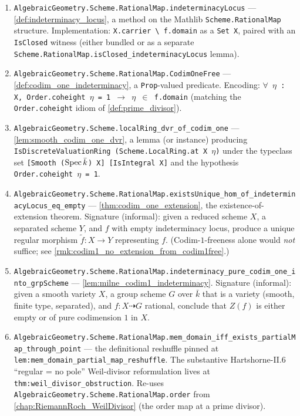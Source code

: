 \begin{enumerate}
  \item \texttt{AlgebraicGeometry.Scheme.RationalMap.indeterminacyLocus} ---
    \cref{def:indeterminacy_locus}, a method on the Mathlib
    \texttt{Scheme.RationalMap} structure. Implementation: \texttt{X.carrier
    \textbackslash{} f.domain} as a \texttt{Set X}, paired with an
    \texttt{IsClosed} witness (either bundled or as a separate
    \texttt{Scheme.RationalMap.isClosed\_indeterminacyLocus} lemma).
  \item \texttt{AlgebraicGeometry.Scheme.RationalMap.CodimOneFree} ---
    \cref{def:codim_one_indeterminacy}, a \texttt{Prop}-valued predicate. Encoding:
    \texttt{\(\forall\) \(\eta\) : X, Order.coheight \(\eta\) = 1 \(\to\) \(\eta\) \(\in\)
    f.domain} (matching the \texttt{Order.coheight} idiom of
    \cref{def:prime_divisor}).
  \item \texttt{AlgebraicGeometry.Scheme.localRing\_dvr\_of\_codim\_one} ---
    \cref{lem:smooth_codim_one_dvr}, a lemma (or instance) producing
    \texttt{IsDiscreteValuationRing (Scheme.LocalRing.at\ X \(\eta\))} under the
    typeclass set \texttt{[Smooth (\(\operatorname{Spec} \bar k\)) X] [IsIntegral X]} and the
    hypothesis \texttt{Order.coheight \(\eta\) = 1}.
  \item \texttt{AlgebraicGeometry.Scheme.RationalMap.existsUnique\_hom\_of\_indeterminacyLocus\_eq\_empty}
    --- \cref{thm:codim_one_extension}, the existence-of-extension theorem. Signature
    (informal): given a reduced scheme \(X\), a separated scheme \(Y\), and
    \(f\) with empty indeterminacy locus, produce a unique regular morphism
    \(\widetilde f \colon X \to Y\) representing \(f\). (Codim-\(1\)-freeness alone
    would \emph{not} suffice; see \cref{rmk:codim1_no_extension_from_codim1free}.)
  \item \texttt{AlgebraicGeometry.Scheme.RationalMap.indeterminacy\_pure\_codim\_one\_into\_grpScheme}
    --- \cref{lem:milne_codim1_indeterminacy}. Signature (informal): given a smooth
    variety \(X\), a group scheme \(G\) over \(\bar k\) that is a variety (smooth, finite
    type, separated), and \(f \colon X \dashrightarrow G\) rational, conclude that
    \(Z(f)\) is either empty or of pure codimension \(1\) in \(X\).
  \item \texttt{AlgebraicGeometry.Scheme.RationalMap.mem\_domain\_iff\_exists\_partialMap\_through\_point}
    --- the definitional reshuffle pinned at
    \texttt{lem:mem_domain_partial_map_reshuffle}. The substantive
    Hartshorne-II.6 ``regular = no pole'' Weil-divisor reformulation lives
    at \texttt{thm:weil_divisor_obstruction}. Re-uses
    \texttt{AlgebraicGeometry.Scheme.RationalMap.order} from
    \cref{chap:RiemannRoch_WeilDivisor} (the order map at a prime divisor).
\end{enumerate}



